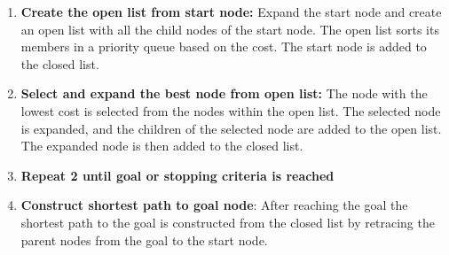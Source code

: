 \begin{enumerate}
\item \textbf{Create the open list from start node:} Expand the start node and create an open list with all the child nodes of the start node. The open list sorts its members in a priority queue based on the cost. The start node is added to the closed list.
\item \textbf{Select and expand the best node from open list:} The node with the lowest cost is selected from the nodes within the open list. The selected node is expanded, and the children of the selected node are added to the open list. The expanded node is then added to the closed list.
\item \textbf{Repeat 2 until goal or stopping criteria is reached}
\item \textbf{Construct shortest path to goal node}: After reaching the goal the shortest path to the goal is constructed from the closed list by retracing the parent nodes from the goal to the start node.
\end{enumerate}